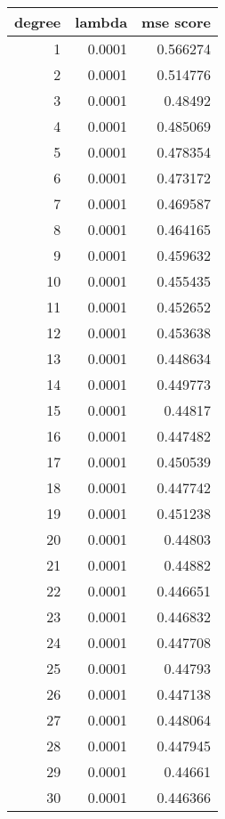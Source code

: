 \begin{tabular}{rrr}
\hline
   degree &   lambda &   mse score \\
\hline
        1 &   0.0001 &    0.566274 \\
        2 &   0.0001 &    0.514776 \\
        3 &   0.0001 &    0.48492  \\
        4 &   0.0001 &    0.485069 \\
        5 &   0.0001 &    0.478354 \\
        6 &   0.0001 &    0.473172 \\
        7 &   0.0001 &    0.469587 \\
        8 &   0.0001 &    0.464165 \\
        9 &   0.0001 &    0.459632 \\
       10 &   0.0001 &    0.455435 \\
       11 &   0.0001 &    0.452652 \\
       12 &   0.0001 &    0.453638 \\
       13 &   0.0001 &    0.448634 \\
       14 &   0.0001 &    0.449773 \\
       15 &   0.0001 &    0.44817  \\
       16 &   0.0001 &    0.447482 \\
       17 &   0.0001 &    0.450539 \\
       18 &   0.0001 &    0.447742 \\
       19 &   0.0001 &    0.451238 \\
       20 &   0.0001 &    0.44803  \\
       21 &   0.0001 &    0.44882  \\
       22 &   0.0001 &    0.446651 \\
       23 &   0.0001 &    0.446832 \\
       24 &   0.0001 &    0.447708 \\
       25 &   0.0001 &    0.44793  \\
       26 &   0.0001 &    0.447138 \\
       27 &   0.0001 &    0.448064 \\
       28 &   0.0001 &    0.447945 \\
       29 &   0.0001 &    0.44661  \\
       30 &   0.0001 &    0.446366 \\
\hline
\end{tabular}